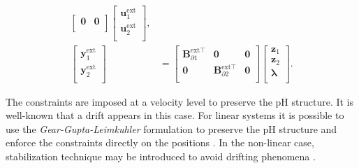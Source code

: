 \begin{equation}
\begin{aligned}
\begin{bmatrix}
\mathbf{0} & \mathbf{0} \\
\end{bmatrix} 
\begin{bmatrix}
\mathbf{u}_1^{\text{ext}} \\ 
\mathbf{u}_2^{\text{ext}} \\
\end{bmatrix}, \\
\begin{bmatrix}
\mathbf{y}_1^{\text{ext}} \\ \mathbf{y}_2^{\text{ext}} \\
\end{bmatrix}  &= \begin{bmatrix}
\mathbf{B}_{\partial 1}^{\text{ext} \top} & \mathbf{0} & \mathbf{0} \\
\mathbf{0} & \mathbf{B}_{\partial 2}^{\text{ext} \top} & \mathbf{0} \\
\end{bmatrix} \begin{bmatrix}
\mathbf{z}_1  \\ 
\mathbf{z}_2  \\ 
\bm{\lambda} \\
\end{bmatrix}.
\end{aligned}
\end{equation}

\begin{remark}
	The constraints  are imposed at a velocity level to preserve the pH structure. It is well-known that a drift appears in this case. For linear systems it is possible to use the \textit{Gear-Gupta-Leimkuhler} formulation to preserve the pH structure and enforce the constraints directly on the positions \cite{scholz2019}. In the non-linear case, stabilization technique may be introduced to avoid drifting phenomena \cite{bauchau2008review,laulusa2008review}. 
\end{remark}

